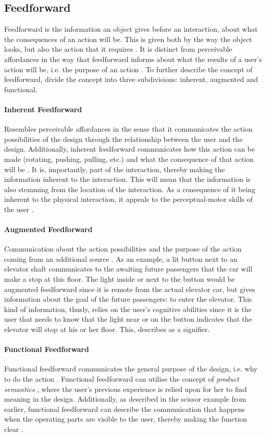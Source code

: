 \subsection{Feedforward} Feedforward is the information an object gives before an interaction, about what the consequences of an action will be. This is given both by the way the object looks, but also the action that it requires \cite{frogger}. It is distinct from perceivable affordances in the way that feedforward informs about what the results of a user's action will be, i.e. the purpose of an action \cite{vermeulen}. To further describe the concept of feedforward,  divide the concept into three subdivisions: inherent, augmented and functional.
\paragraph{Inherent Feedforward} Resembles perceivable affordances \cite{norman} in the sense that it communicates the action possibilities of the design through the relationship between the user and the design. Additionally, inherent feedforward communicates how this action can be made (rotating, pushing, pulling, etc.) and what the consequence of that action will be \cite{frogger}. It is, importantly, part of the interaction, thereby making the information inherent to the interaction. This will mean that the information is also stemming from the location of the interaction. As a consequence of it being inherent to the physical interaction, it appeals to the perceptual-motor skills of the user \cite{frogger}.
\paragraph{Augmented Feedforward} Communication about the action possibilities and the purpose of the action coming from an additional source \cite{frogger}. As an example, a lit button next to an elevator shaft communicates to the awaiting future passengers that the car will make a stop at this floor. The light inside or next to the button would be augmented feedforward since it is remote from the actual elevator car, but gives information about the goal of the future passengers: to enter the elevator. This kind of information, thusly, relies on the user's cognitive abilities since it is the user that needs to know that the light near or on the button indicates that the elevator will stop at his or her floor. This,  describes as a signifier.
\paragraph{Functional Feedforward} Functional feedforward communicates the general purpose of the design, i.e. why to do the action \cite{frogger}. Functional feedforward can utilise the concept of \textit{product semantics} \cite{semantics}, where the user's previous experience is relied upon for her to find meaning in the design. Additionally, as described in the scissor example from earlier, functional feedforward can describe the communication that happens when the operating parts are visible to the user, thereby making the function clear \cite{frogger}.

